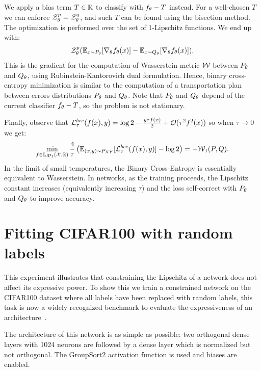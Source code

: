 We apply a bias term $T\in\mathbb{R}$ to classify with $f_{\theta}-T$ instead. For a well-chosen $T$ we can enforce $\mathcal{Z}^p_{\theta}=\mathcal{Z}^q_{\theta}$, and such $T$ can be found using the bisection method. The optimization is performed over the set of \mbox{1-Lipschitz} functions. We end up with:
\begin{equation}
    \mathcal{Z}^p_{\theta}(\mathbb{E}_{x\sim P_{\theta}}[\nabla_{\theta}f_{\theta}(x)]-\mathbb{E}_{x\sim Q_{\theta}}[\nabla_{\theta}f_{\theta}(x)]).
\end{equation}
This is the gradient for the computation of Wasserstein metric $\mathcal{W}$ between $P_{\theta}$ and $Q_{\theta}$, using Rubinstein-Kantorovich dual formulation. Hence, binary cross-entropy minimization is similar to the computation of a transportation plan between errors distributions $P_{\theta}$ and $Q_{\theta}$. Note that $P_{\theta}$ and $Q_{\theta}$ depend of the current classifier $f_{\theta}-T$, so the problem is not stationary.  
  
Finally, observe that $\mathcal{L}^{bce}_{\tau}(f(x),y)=\log{2}-\frac{y\tau f(x)}{2}+\mathcal{O}(\tau^2 f^2(x))$ so when $\tau\rightarrow 0$ we get:
$$\min_{f\in\text{Lip}_1(\mathcal{X},\mathbb{R})}\frac{4}{\tau}\left(\mathbb{E}_{(x,y)\sim P_{XY}}[\mathcal{L}^{bce}_{\tau}(f(x),y)]-\log{2}\right)=-\mathcal{W}_1(P,Q).$$
In the limit of small temperatures, the Binary Cross-Entropy is essentially equivalent to Wasserstein. In \LipInf networks, as the training proceeds, the Lipschitz constant increases (equivalently increasing $\tau$) and the loss self-correct with $P_{\theta}$ and $Q_{\theta}$ to improve accuracy.  
  
\section{Fitting CIFAR100 with random labels}
    \label{section:cifar100_random}
    
    This experiment illustrates that constraining the Lipschitz of a network does not affect its expressive power. To show this we train a constrained network on the CIFAR100 dataset where all labels have been replaced with random labels, this task is now a widely recognized benchmark to evaluate the expressiveness of an architecture~\cite{zhang2021understanding}. 
    
    
    The architecture of this network is as simple as possible: two orthogonal dense layers with 1024 neurons are followed by a dense layer which is normalized but not orthogonal. %
    The GroupSort2 activation function is used and biases are enabled.
    
